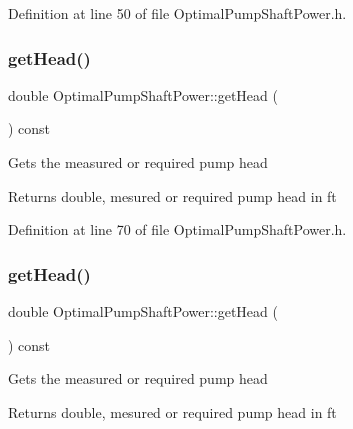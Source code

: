 Definition at line 50 of file Optimal\+Pump\+Shaft\+Power.\+h.

\mbox{\label{class_optimal_pump_shaft_power_abb285a8a256c10187113c34db1a4462b}} 
\subsubsection{\texorpdfstring{get\+Head()}{getHead()}\hspace{0.1cm}{\footnotesize\ttfamily [1/3]}}
{\footnotesize\ttfamily double Optimal\+Pump\+Shaft\+Power\+::get\+Head (\begin{DoxyParamCaption}{ }\end{DoxyParamCaption}) const\hspace{0.3cm}{\ttfamily [inline]}}

Gets the measured or required pump head

\begin{DoxyReturn}{Returns}
double, mesured or required pump head in ft 
\end{DoxyReturn}


Definition at line 70 of file Optimal\+Pump\+Shaft\+Power.\+h.

\mbox{\label{class_optimal_pump_shaft_power_abb285a8a256c10187113c34db1a4462b}} 
\subsubsection{\texorpdfstring{get\+Head()}{getHead()}\hspace{0.1cm}{\footnotesize\ttfamily [2/3]}}
{\footnotesize\ttfamily double Optimal\+Pump\+Shaft\+Power\+::get\+Head (\begin{DoxyParamCaption}{ }\end{DoxyParamCaption}) const\hspace{0.3cm}{\ttfamily [inline]}}

Gets the measured or required pump head

\begin{DoxyReturn}{Returns}
double, mesured or required pump head in ft 
\end{DoxyReturn}


